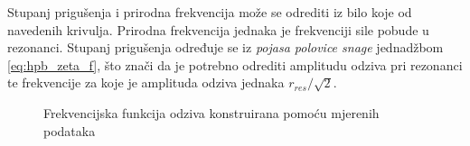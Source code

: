 Stupanj prigušenja i prirodna frekvencija može se odrediti iz bilo koje od navedenih
krivulja. Prirodna frekvencija jednaka je frekvenciji sile pobude u rezonanci.
Stupanj prigušenja određuje se iz \textit{pojasa polovice snage} jednadžbom
\eqref{eq:hpb_zeta_f}, što znači da je potrebno odrediti amplitudu odziva pri
rezonanci te frekvencije za koje je amplituda odziva jednaka $r_{res}/\sqrt{2}$.
\begin{figure}[H]
    
    \caption{Frekvencijska funkcija odziva konstruirana pomoću mjerenih podataka}
    \label{fig:frf-poku}
\end{figure}
